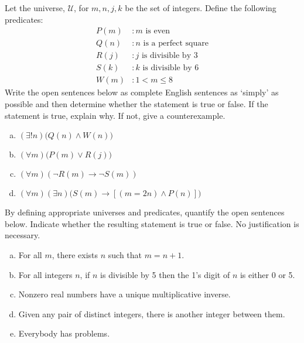 \documentclass[11pt,letterpaper]{article}
\begin{document}

 Let the universe, $\mathcal{U}$, for $m, n, j, k$ be the set of integers. Define the following predicates:
	\[
	\begin{aligned}
	P(m) &\colon m \text{ is even} \\
	Q(n) &\colon n \text{ is a perfect square} \\
	R(j) &\colon j \text{ is divisible by 3} \\
	S(k) &\colon k \text{ is divisible by 6} \\
	W(m) &\colon 1 < m \leq 8
	\end{aligned}
	\]
Write the open sentences below as complete English sentences as `simply' as possible and then determine whether the statement is true or false. If the statement is true, explain why. If not, give a counterexample. 
	\begin{enumerate}[(a)]
	\item $(\exists! n) \big( Q(n) \wedge W(n) \big)$ 
	\item $(\forall m) \big( P(m) \vee R(j) \big)$ 
	\item $(\forall m) (\neg R(m) \to \neg S(m))$ 
	\item $(\forall m) (\exists n) \big( S(m) \to [(m= 2n) \wedge P(n)] \big)$ 
	\end{enumerate}



\newpage



 By defining appropriate universes and predicates, quantify the open sentences below. Indicate whether the resulting statement is true or false. No justification is necessary. 
	\begin{enumerate}[(a)]
	\item For all $m$, there exists $n$ such that $m= n + 1$.
	\item For all integers $n$, if $n$ is divisible by 5 then the 1's digit of $n$ is either 0 or 5.
	\item Nonzero real numbers have a unique multiplicative inverse. 
	\item Given any pair of distinct integers, there is another integer between them.
	\item Everybody has problems. 
	\end{enumerate}
\end{document}
